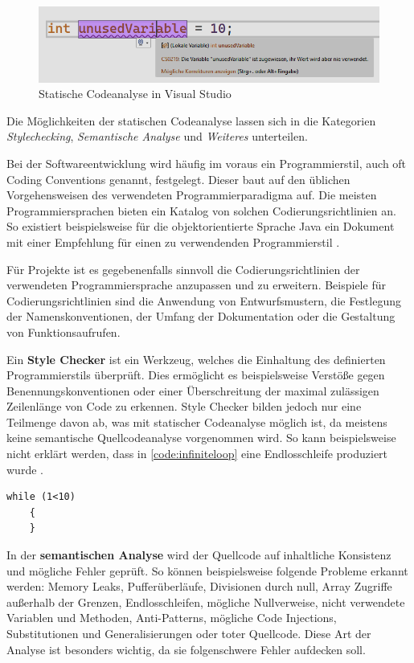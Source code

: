 \begin{figure}[!htb] 
	\centering
	\includegraphics[width=125mm]{images/ide_linting.png}
	\caption{Statische Codeanalyse in Visual Studio}
	\label{fig:lint_vs}
\end{figure}
\FloatBarrier

Die Möglichkeiten der statischen Codeanalyse lassen sich in die Kategorien \textit{Stylechecking}, \textit{Semantische Analyse} und \textit{Weiteres} unterteilen.

\label{subsubsec:style}Bei der Softwareentwicklung wird häufig im voraus ein Programmierstil, auch oft Coding Conventions genannt, festgelegt. Dieser baut auf den üblichen Vorgehensweisen des verwendeten Programmierparadigma auf. Die meisten Programmiersprachen bieten ein Katalog von solchen Codierungsrichtlinien an. So existiert beispielsweise für die objektorientierte Sprache Java ein Dokument mit einer Empfehlung für einen zu verwendenden Programmierstil \cite{java_coding_conventions}.

Für Projekte ist es gegebenenfalls sinnvoll die Codierungsrichtlinien der verwendeten Programmiersprache anzupassen und zu erweitern.
Beispiele für Codierungsrichtlinien sind die Anwendung von Entwurfsmustern, die Festlegung der Namenskonventionen, der Umfang der Dokumentation oder die Gestaltung von Funktionsaufrufen.

Ein \textbf{Style Checker} ist ein Werkzeug, welches die Einhaltung des definierten Programmierstils überprüft. Dies ermöglicht es beispielsweise Verstöße gegen Benennungskonventionen oder einer Überschreitung der maximal zulässigen Zeilenlänge von Code zu erkennen. Style Checker bilden jedoch nur eine Teilmenge davon ab, was mit statischer Codeanalyse möglich ist, da meistens keine semantische Quellcodeanalyse vorgenommen wird.  So kann beispielsweise nicht erklärt werden, dass in \autoref{code:infiniteloop} eine Endlosschleife produziert wurde \cite{lwn.net}\cite{wiki:Style_Checker}.
\begin{lstlisting}[caption={Endlosschleife}, label=code:infiniteloop]
	while (1<10)
	{
	}
\end{lstlisting}
\FloatBarrier
In der \textbf{semantischen Analyse} wird der Quellcode auf inhaltliche Konsistenz und mögliche Fehler geprüft. So können beispielsweise folgende Probleme erkannt werden: Memory Leaks, Pufferüberläufe, Divisionen durch null, Array Zugriffe außerhalb der Grenzen, Endlosschleifen, mögliche Nullverweise, nicht verwendete Variablen und Methoden, Anti-Patterns, mögliche Code Injections, Substitutionen und Generalisierungen oder toter Quellcode. Diese Art der Analyse ist besonders wichtig, da sie folgenschwere Fehler aufdecken soll.

